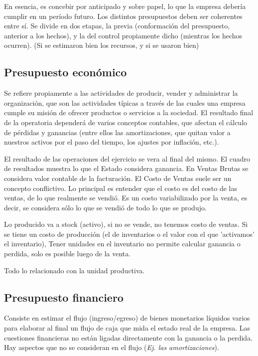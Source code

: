 \documentclass[titlepage,a4paper]{article}
\begin{document}
En esencia, es concebir por anticipado y sobre papel, lo que la empresa debería cumplir en un período futuro. Los distintos presupuestos deben ser coherentes entre sí. Se divide en dos etapas, la previa (conformación del presupuesto, anterior a los hechos), y la del control propiamente dicho (mientras los hechos ocurren). (Si se estimaron bien los recursos, y si se usaron bien)

\subsection{Presupuesto económico}

Se refiere propiamente a las actividades de producir, vender y administrar la 
organización, que son las actividades típicas a través de las cuales una empresa cumple su misión de ofrecer 
productos o servicios a la sociedad. El resultado final de la operatoria dependerá de varios conceptos 
contables, que afectan el cálculo de pérdidas y ganancias (entre ellos las amortizaciones, que quitan valor a 
nuestros activos por el paso del tiempo, los ajustes por inflación, etc.).

El resultado de las operaciones del ejercicio se vera al final del mismo. El cuadro de resultados muestra lo que el Estado considera ganancia. En Ventas Brutas se considera valor contable de la facturación. El Costo de Ventas suele ser un concepto conflictivo. Lo 
principal es entender que el costo es del costo de las ventas, de lo que realmente se vendió. Es un 
costo variabilizado por la venta, es decir, se considera sólo lo que se vendió de todo lo que se produjo.

Lo producido va a stock (activo), si no se vende, no tenemos costo de ventas. Si se tiene un costo de producción (el de inventarios o el valor con el que 'activamos' el inventario), Tener unidades en el inventario no permite calcular ganancia o perdida, solo es posible luego de la venta.

Todo lo relacionado con la unidad productiva.

\subsection{Presupuesto financiero}

Consiste en estimar el flujo (ingreso/egreso) de bienes monetarios líquidos varios para elaborar al final un flujo de caja que mida el estado real de la empresa. Las cuestiones financieras no están ligadas directamente con la ganancia o la perdida. Hay aspectos que no se consideran en el flujo (\textit{Ej. las amortizaciones}).
\end{document}
